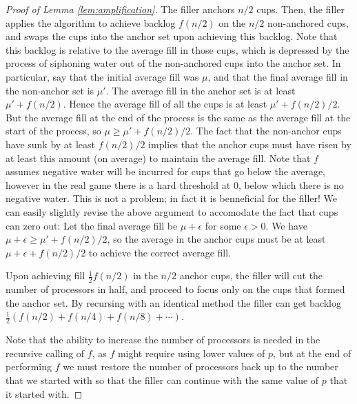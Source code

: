 \documentclass[twocolumn]{article}[11pt]
\begin{document}
\begin{proof}[Proof of Lemma \ref{lem:amplification}]
  The filler anchors $n/2$ cups. Then, the filler applies the algorithm to
  achieve backlog $f(n/2)$ on the $n/2$ non-anchored cups, and swaps the cups
  into the anchor set upon achieving this backlog. Note that this backlog is
  relative to the average fill in those cups, which is depressed by the process
  of siphoning water out of the non-anchored cups into the anchor set. In
  particular, say that the initial average fill was $\mu$, and that the final
  average fill in the non-anchor set is $\mu'$. The average fill in the anchor
  set is at least $\mu' + f(n/2)$. Hence the average fill of all the cups is at
  least $\mu' + f(n/2)/2$. But the average fill at the end of the process is
  the same as the average fill at the start of the process, so $\mu \ge \mu' +
  f(n/2)/2$. The fact that the non-anchor cups have sunk by at least $f(n/2)/2$
  implies that the anchor cups must have risen by at least this amount (on
  average) to maintain the average fill. Note that $f$ assumes negative water
  will be incurred for cups that go below the average, however in the real game
  there is a hard threshold at $0$, below which there is no negative water.
  This is not a problem; in fact it is benneficial for the filler! We can
  easily slightly revise the above argument to accomodate the fact that cups
  can zero out: Let the final average fill be $\mu+\epsilon$ for some
  $\epsilon>0$. We have $\mu+\epsilon \ge \mu' + f(n/2)/2$, so the average in the
  anchor cups must be at least $\mu+\epsilon+f(n/2)/2$ to achieve the correct
  average fill.
  
  Upon achieving fill $\frac{1}{2}f(n/2)$ in the $n/2$ anchor cups, the filler
  will cut the number of processors in half, and proceed to focus only on the
  cups that formed the anchor set. By recursing with an identical method the
  filler can get backlog $\frac{1}{2}(f(n/2) + f(n/4) + f(n/8) + \cdots)$.

  Note that the ability to increase the number of processors is needed in the
  recursive calling of $f$, as $f$ might require using lower values of $p$, but
  at the end of performing $f$ we must restore the number of processors back up
  to the number that we started with so that the filler can continue with the
  same value of $p$ that it started with.


\end{proof}
\end{document}
